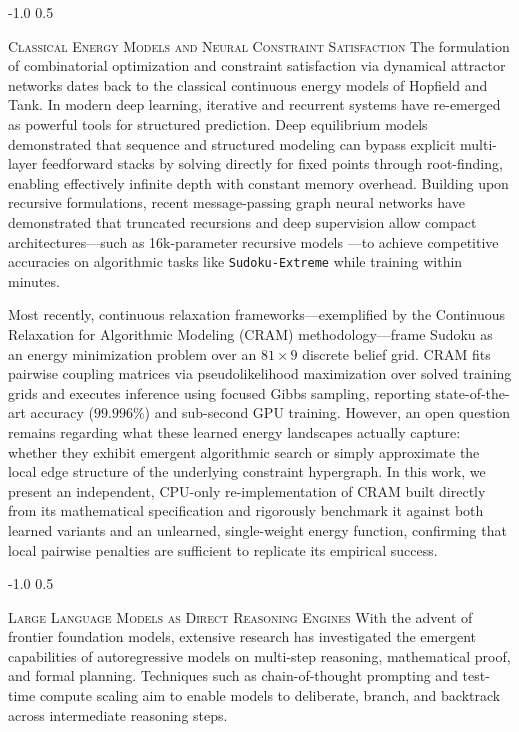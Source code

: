 \documentclass{article} %
\makeatletter
\renewcommand{\subsection}{\@startsection{subsection}{2}{\z@}%
  {-1.0\baselineskip}%
  {0.5\baselineskip}%
  {\normalfont\fontsize{10pt}{12pt}\selectfont\scshape\raggedright}}
\makeatother
\begin{document}
\subsection{\textsc{Classical Energy Models and Neural Constraint Satisfaction}}
The formulation of combinatorial optimization and constraint satisfaction via dynamical attractor networks dates back to the classical continuous energy models of Hopfield and Tank. In modern deep learning, iterative and recurrent systems have re-emerged as powerful tools for structured prediction. Deep equilibrium models \citep{Bai2019DeepEquilibrium} demonstrated that sequence and structured modeling can bypass explicit multi-layer feedforward stacks by solving directly for fixed points through root-finding, enabling effectively infinite depth with constant memory overhead. Building upon recursive formulations, recent message-passing graph neural networks have demonstrated that truncated recursions and deep supervision allow compact architectures—such as 16k-parameter recursive models \citep{Salvatori2026TinyRecursive}—to achieve competitive accuracies on algorithmic tasks like \texttt{Sudoku-Extreme} while training within minutes. 

Most recently, continuous relaxation frameworks—exemplified by the Continuous Relaxation for Algorithmic Modeling (CRAM) methodology—frame Sudoku as an energy minimization problem over an $81 \times 9$ discrete belief grid. CRAM fits pairwise coupling matrices via pseudolikelihood maximization over solved training grids and executes inference using focused Gibbs sampling, reporting state-of-the-art accuracy ($99.996\%$) and sub-second GPU training. However, an open question remains regarding what these learned energy landscapes actually capture: whether they exhibit emergent algorithmic search or simply approximate the local edge structure of the underlying constraint hypergraph. In this work, we present an independent, CPU-only re-implementation of CRAM built directly from its mathematical specification and rigorously benchmark it against both learned variants and an unlearned, single-weight energy function, confirming that local pairwise penalties are sufficient to replicate its empirical success.

\subsection{\textsc{Large Language Models as Direct Reasoning Engines}}
With the advent of frontier foundation models, extensive research has investigated the emergent capabilities of autoregressive models on multi-step reasoning, mathematical proof, and formal planning. Techniques such as chain-of-thought prompting and test-time compute scaling aim to enable models to deliberate, branch, and backtrack across intermediate reasoning steps. 
\end{document}
